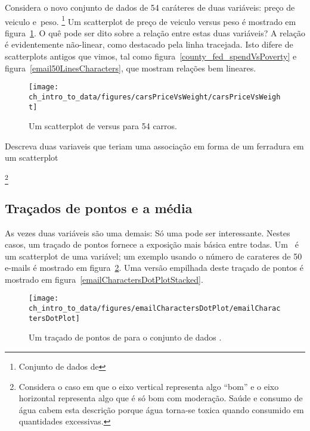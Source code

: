 \begin{example}{
  Considera o novo conjunto de dados de 54 caráteres de duas variáveis:
  preço de veiculo e~peso.
  \footnote{
   Conjunto de dados de 
  }
  Um scatterplot de preço de veiculo versus peso é mostrado em figura~\ref{carsPriceVsWeight}.
  O quê pode ser dito sobre a relação entre estas duas variáveis?
}
A relação é evidentemente não-linear, como destacado pela linha tracejada.
Isto difere de scatterplots antigos que vimos, tal como figura~\vref{county_fed_spendVsPoverty} e figura~\ref{email50LinesCharacters}, que mostram relações bem lineares.

\begin{figure}[h]
   \centering
   \texttt{[image: ch\_intro\_to\_data/figures/carsPriceVsWeight/carsPriceVsWeight]}
   \caption{Um scatterplot de  versus  para 54 carros.}
   \label{carsPriceVsWeight}
\end{figure}
\end{example}

\begin{exercise}
 Descreva duas variaveis que teriam uma associação em forma de um ferradura em um scatterplot

 \footnote{
   Considera o caso em que o eixo vertical representa algo ``bom'' e o eixo horizontal representa algo que é só bom com moderação.
  Saúde e consumo de água cabem esta descrição porque água torna-se toxica quando consumido em quantidades excessivas.
 }
\end{exercise}

\subsection{Traçados de pontos e a média}
\label{dotPlot}

As vezes duas variáveis são uma demais:
Só uma pode ser interessante.
Nestes casos, um traçado de pontos fornece a exposição mais básica entre todas.
Um~ é um scatterplot de uma variável;
um exemplo usando o número de carateres de 50 e-mails é mostrado em figura~\ref{emailCharactersDotPlot}.
Uma versão empilhada deste traçado de pontos é mostrado em figura~\ref{emailCharactersDotPlotStacked}.

\begin{figure}[h]
   \centering
   \texttt{[image: ch\_intro\_to\_data/figures/emailCharactersDotPlot/emailCharactersDotPlot]}
   \caption{Um traçado de pontos de  para o conjunto de dados .}
   \label{emailCharactersDotPlot}
\end{figure}

